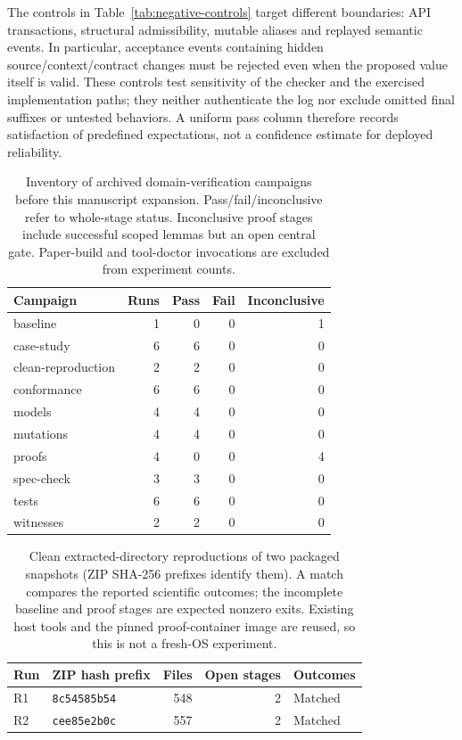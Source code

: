 \documentclass[pdflatex,sn-mathphys-num]{sn-jnl}
\theoremstyle{thmstyleone}
\theoremstyle{thmstylethree}
\theoremstyle{thmstyletwo}
\begin{document}
The controls in Table~\ref{tab:negative-controls} target different boundaries: API transactions, structural admissibility, mutable aliases and replayed semantic events. In particular, acceptance events containing hidden source/context/contract changes must be rejected even when the proposed value itself is valid. These controls test sensitivity of the checker and the exercised implementation paths; they neither authenticate the log nor exclude omitted final suffixes or untested behaviors. A uniform pass column therefore records satisfaction of predefined expectations, not a confidence estimate for deployed reliability.

\begin{table}[tbp]
\centering
\caption{Inventory of archived domain-verification campaigns before this manuscript expansion. Pass/fail/inconclusive refer to whole-stage status. Inconclusive proof stages include successful scoped lemmas but an open central gate. Paper-build and tool-doctor invocations are excluded from experiment counts.}\label{tab:campaign-history}
\footnotesize
\setlength{\tabcolsep}{3pt}
\renewcommand{\arraystretch}{1.13}
\begin{tabularx}{\linewidth}{@{}Xrrrr@{}}\toprule
Campaign & Runs & Pass & Fail & Inconclusive\\\midrule
baseline & 1 & 0 & 0 & 1\\
case-study & 6 & 6 & 0 & 0\\
clean-reproduction & 2 & 2 & 0 & 0\\
conformance & 6 & 6 & 0 & 0\\
models & 4 & 4 & 0 & 0\\
mutations & 4 & 4 & 0 & 0\\
proofs & 4 & 0 & 0 & 4\\
spec-check & 3 & 3 & 0 & 0\\
tests & 6 & 6 & 0 & 0\\
witnesses & 2 & 2 & 0 & 0\\
\bottomrule\end{tabularx}
\end{table}

\begin{table}[tbp]
\centering
\caption{Clean extracted-directory reproductions of two packaged snapshots (ZIP SHA-256 prefixes identify them). A match compares the reported scientific outcomes; the incomplete baseline and proof stages are expected nonzero exits. Existing host tools and the pinned proof-container image are reused, so this is not a fresh-OS experiment.}\label{tab:clean-reproductions}
\footnotesize
\setlength{\tabcolsep}{3pt}
\renewcommand{\arraystretch}{1.13}
\begin{tabularx}{\linewidth}{@{}llrrl@{}}\toprule
Run & ZIP hash prefix & Files & Open stages & Outcomes\\\midrule
R1 & \texttt{8c54585b54} & 548 & 2 & Matched\\
R2 & \texttt{cee85e2b0c} & 557 & 2 & Matched\\
\bottomrule\end{tabularx}
\end{table}
\end{document}
